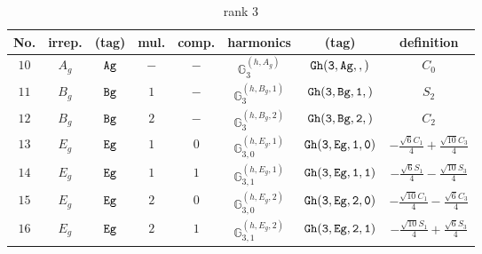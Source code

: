 \documentclass[fleqn,8pt]{jsarticle}
\begin{document}
\begin{table}[ht!]
\begin{center}
\caption{rank 3}
\renewcommand{\arraystretch}{1.3}
\begin{tabular}{cccccccc} \hline \hline
No. & irrep. & (tag) & mul. & comp. & harmonics & (tag) & definition \\ \hline
$ 10 $ & $ A_{g} $ & $ {\tt Ag} $ & $ - $ & $ - $ & $ \mathbb{G}_{3}^{(h,A_{g})} $ & $ {\tt Gh(3,Ag,,)} $ & $ C_{0} $ \\
$ 11 $ & $ B_{g} $ & $ {\tt Bg} $ & $ 1 $ & $ - $ & $ \mathbb{G}_{3}^{(h,B_{g},1)} $ & $ {\tt Gh(3,Bg,1,)} $ & $ S_{2} $ \\
$ 12 $ & $ B_{g} $ & $ {\tt Bg} $ & $ 2 $ & $ - $ & $ \mathbb{G}_{3}^{(h,B_{g},2)} $ & $ {\tt Gh(3,Bg,2,)} $ & $ C_{2} $ \\
$ 13 $ & $ E_{g} $ & $ {\tt Eg} $ & $ 1 $ & $ 0 $ & $ \mathbb{G}_{3,0}^{(h,E_{g},1)} $ & $ {\tt Gh(3,Eg,1,0)} $ & $ - \frac{\sqrt{6} C_{1}}{4} + \frac{\sqrt{10} C_{3}}{4} $ \\
$ 14 $ & $ E_{g} $ & $ {\tt Eg} $ & $ 1 $ & $ 1 $ & $ \mathbb{G}_{3,1}^{(h,E_{g},1)} $ & $ {\tt Gh(3,Eg,1,1)} $ & $ - \frac{\sqrt{6} S_{1}}{4} - \frac{\sqrt{10} S_{3}}{4} $ \\
$ 15 $ & $ E_{g} $ & $ {\tt Eg} $ & $ 2 $ & $ 0 $ & $ \mathbb{G}_{3,0}^{(h,E_{g},2)} $ & $ {\tt Gh(3,Eg,2,0)} $ & $ - \frac{\sqrt{10} C_{1}}{4} - \frac{\sqrt{6} C_{3}}{4} $ \\
$ 16 $ & $ E_{g} $ & $ {\tt Eg} $ & $ 2 $ & $ 1 $ & $ \mathbb{G}_{3,1}^{(h,E_{g},2)} $ & $ {\tt Gh(3,Eg,2,1)} $ & $ - \frac{\sqrt{10} S_{1}}{4} + \frac{\sqrt{6} S_{3}}{4} $ \\
 \hline \hline
\end{tabular}
\end{center}
\end{table}
\end{document}
